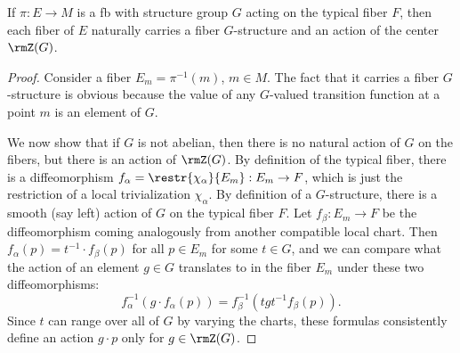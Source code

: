 \begin{prop}\label{prop G-fibers}
    If $\pi:E\to M$ is a \gls{fb} with structure group $G$ acting on the typical fiber $F$, then each fiber of $E$ naturally carries a fiber $G$-structure and an action of the center $\rmZ(G)$.
\end{prop}
\begin{proof}
    Consider a fiber $E_m=\pi^{-1}(m)$, $m\in M$. The fact that it carries a fiber $G$-structure is obvious because the value of any $G$-valued transition function at a point $m$ is an element of $G$. 
    
    We now show that if $G$ is not abelian, then there is no natural action of $G$ on the fibers, but there is an action of $\rmZ(G)$. By definition of the typical fiber, there is a diffeomorphism $f_\alpha=\restr{\chi_\alpha}{E_m}:E_m\to F$, which is just the restriction of a local trivialization $\chi_\alpha$. By definition of a $G$-structure, there is a smooth (say left) action of $G$ on the typical fiber $F$. Let $f_\beta:E_m\to F$ be the diffeomorphism coming analogously from another compatible local chart. Then $f_\alpha(p)=t^{-1}\cdot f_\beta(p)$ for all $p\in E_m$ for some $t\in G$, and we can compare what the action of an element $g\in G$ translates to in the fiber $E_m$ under these two diffeomorphisms:
    \[f_\alpha^{-1}(g\cdot f_\alpha(p))=f_\beta^{-1}(tgt^{-1} f_\beta(p)).\]
    Since $t$ can range over all of $G$ by varying the charts, these formulas consistently define an action $g\cdot p$ only for $g\in \rmZ(G)$.
\end{proof}

